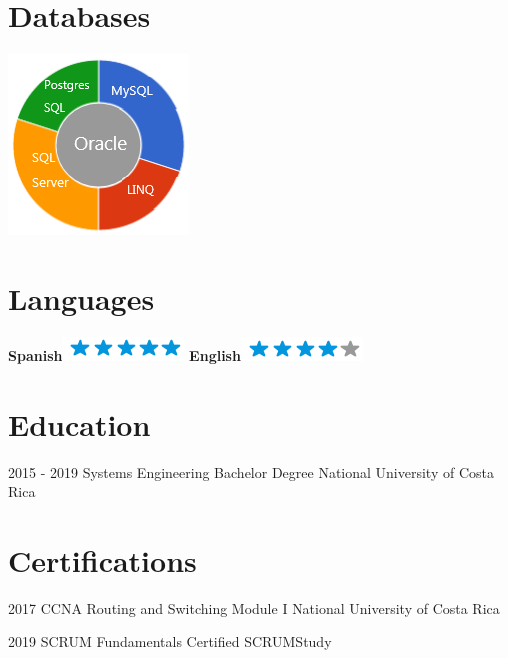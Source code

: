 \documentclass[]{friggeri-cv}
\begin{document}
\begin{aside}
  \section{Databases}
    \includegraphics[scale=0.62]{img/DB.png}
    ~
   \section{Languages}
    \textbf{Spanish}\includegraphics[scale=0.40]{img/5stars.png}
    \textbf{English}\includegraphics[scale=0.40]{img/4stars.png}
\end{aside}

\section{Education}
\begin{entrylist}
  \entry
    {2015 - 2019}
    {Systems Engineering Bachelor Degree}
    {National University of Costa Rica}
    
    
\end{entrylist}

\section{Certifications}
\begin{entrylist}
  \entry
    {2017}
    {CCNA Routing and Switching Module I}
    {National University of Costa Rica}
    
    \entry
    {2019}
    {SCRUM Fundamentals Certified}
    {SCRUMStudy}
    
\end{entrylist}
\end{document}
